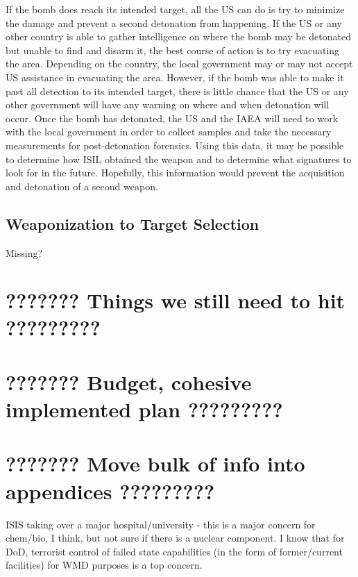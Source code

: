 \documentclass{report}
\begin{document}
If the bomb does reach its intended target, all the US can do is try to minimize the damage and prevent a second detonation from happening.  If the US or any other country is able to gather intelligence on where the bomb may be detonated but unable to find and disarm it, the best course of action is to try evacuating the area.  Depending on the country, the local government may or may not accept US assistance in evacuating the area.  However, if the bomb was able to make it past all detection to its intended target, there is little chance that the US or any other government will have any warning on where and when detonation will occur.  Once the bomb has detonated, the US and the IAEA will need to work with the local government in order to collect samples and take the necessary measurements for post-detonation forensics.  Using this data, it may be possible to determine how ISIL obtained the weapon and to determine what signatures to look for in the future.  Hopefully, this information would prevent the acquisition and detonation of a second weapon.



\section{Weaponization to Target Selection}


Missing?




\chapter{???????   Things we still need to hit   ?????????}

\chapter{???????   Budget, cohesive implemented plan   ?????????}

\chapter{???????   Move bulk of info into appendices    ?????????}


ISIS taking over a major hospital/university - this is a major concern for chem/bio, I think, but not sure if there is a nuclear component. I know that for DoD, terrorist control of failed state capabilities (in the form of former/current facilities) for WMD purposes is a top concern.
\end{document}
